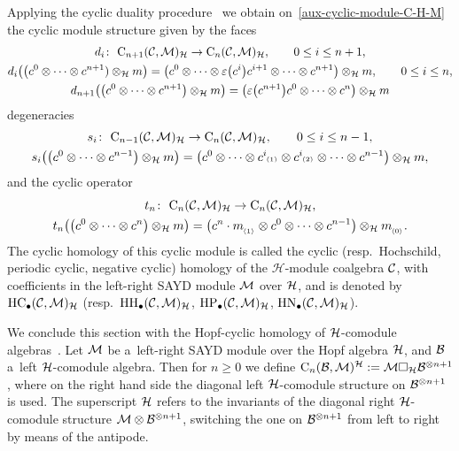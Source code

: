 \documentclass[pdftex]{sigma}
\numberwithin{equation}{section}
\newcommand{\ps}[1]{~\hspace{-4pt}_{^{(#1)}}}
\newcommand{\ns}[1]{~\hspace{-4pt}_{_{{\langle#1\rangle}}}}
\begin{document}
Applying the cyclic duality procedure~\cite{Conn83,KhalRang05} we obtain on~\eqref{aux-cyclic-module-C-H-M} the cyclic
module structure given by the faces
\begin{gather*}%
d_i\colon \ {\rm C}_{n+1}({\cal C},{\cal M})_{{\cal H}} \to {\rm C}_n({\cal C},{\cal M})_{{\cal H}},
\qquad
0 \leq i \leq n+1,
\\
d_i\big(\big(c^0 \otimes \cdots \otimes c^{n+1}) \otimes_{{\cal H}} m\big) =\big(c^0 \otimes \cdots \otimes \varepsilon\big(c^i\big)c^{i+1}
\otimes \cdots \otimes c^{n+1}\big) \otimes_{{\cal H}} m,
\qquad
0 \leq i \leq n,
\\
d_{n+1}\big(\big(c^0 \otimes \cdots \otimes c^{n+1}\big) \otimes_{{\cal H}} m\big) =\big(\varepsilon\big(c^{n+1}\big) c^0 \otimes \cdots \otimes
c^{n}\big) \otimes_{{\cal H}} m
\end{gather*}
degeneracies
\begin{gather*}%
s_i\colon \ {\rm C}_{n-1}({\cal C},{\cal M})_{{\cal H}} \to {\rm C}_n({\cal C},{\cal M})_{{\cal H}},
\qquad
0 \leq i \leq n-1,
\\
s_i\big(\big(c^0 \otimes \cdots \otimes c^{n-1}\big) \otimes_{\mathcal{H}} m\big) =\big(c^0 \otimes \cdots \otimes c^i\ps{1} \otimes
c^i\ps{2} \otimes \cdots \otimes c^{n-1}\big) \otimes_{\mathcal{H}} m,
\end{gather*}
and the cyclic operator
\begin{gather*}%
t_n\colon \ {\rm C}_{n}({\cal C},{\cal M})_{{\cal H}} \to {\rm C}_n({\cal C},{\cal M})_{{\cal H}},
\\
t_n\big(\big(c^0 \otimes \cdots \otimes c^n\big) \otimes_{{\cal H}} m\big) =\big(c^n \cdot m\ns{1} \otimes c^0 \otimes \cdots \otimes
c^{n-1}\big) \otimes_{{\cal H}} m\ns{0}.
\end{gather*}
The cyclic homology of this cyclic module is called the cyclic (resp.\
Hochschild, periodic cyclic, negative cyclic) homology of the $\mathcal{H}$-module coalgebra ${\cal C}$, with
coef\/f\/icients in the left-right SAYD module ${\cal M}$ over ${\cal H}$, and is denoted by ${\rm HC}_\bullet({\cal
C},{\cal M})_{\cal H}$ (resp.\
${\rm HH}_\bullet({\cal C},{\cal M})_{\cal H}$, ${\rm HP}_\bullet({\cal C},{\cal M})_{\cal H}$, ${\rm HN}_\bullet({\cal
C},{\cal M})_{\cal H}$).

We conclude this section with the Hopf-cyclic homology of ${\cal H}$-comodule algebras~\cite{HajaKhalRangSomm04-II}.
Let ${\cal M}$ be a~left-right SAYD module over the Hopf algebra ${\cal H}$, and ${\cal B}$ a~left ${\cal H}$-comodule algebra.
Then for $n\geq 0$ we def\/ine ${\rm C}_{n}({\cal B},{\cal M})^{{\cal H}}:={\cal M} \Box_{\cal H} {\cal B}^{\otimes n+1}$,
where on the right hand side the diagonal left ${\cal H}$-comodule structure on ${\cal B}^{\otimes n+1}$ is used.
The superscript ${\cal H}$ refers to the invariants of the diagonal right ${\cal H}$-comodule structure ${\cal
M}\otimes{\cal B}^{\otimes n+1}$, switching the one on ${\cal B}^{\otimes n+1}$ from left to right by means of the
antipode.
\end{document}
